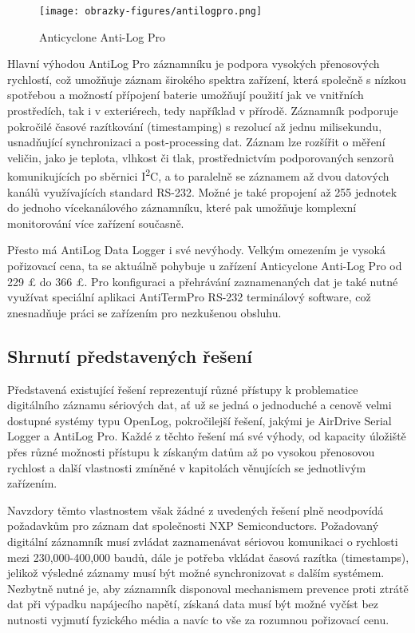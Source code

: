 \begin{figure}[h]
    \centering
    \texttt{[image: obrazky-figures/antilogpro.png]}
    
    \caption{Anticyclone Anti-Log Pro \cite{anticyclone_systems_antilog_pro_price}}
    \label{fig:antilog-pro}
\end{figure}

Hlavní výhodou AntiLog Pro záznamníku je podpora vysokých přenosových rychlostí, což umožňuje záznam širokého spektra zařízení, která společně s nízkou spotřebou a možností přípojení baterie umožňují použití jak ve vnitřních prostředích, tak i v exteriérech, tedy například v přírodě. Záznamník podporuje pokročilé časové razítkování (timestamping) s rezolucí až jednu milisekundu, usnadňující synchronizaci a post-processing dat. Záznam lze rozšířit o měření veličin, jako je teplota, vlhkost či tlak, prostřednictvím podporovaných senzorů komunikujících po sběrnici I\textsuperscript{2}C, a to paralelně se záznamem až dvou datových kanálů využívajících standard RS-232. Možné je také propojení až 255 jednotek do jednoho vícekanálového záznamníku, které pak umožňuje komplexní monitorování více zařízení současně. \cite{anticyclone_systems_antilog_pro, anticyclone_systems_antilog_pro_extended_logging}

Přesto má AntiLog Data Logger i své nevýhody. Velkým omezením je vysoká pořizovací cena, ta se aktuálně pohybuje u zařízení Anticyclone Anti-Log Pro od 229 £ do 366 £. Pro konfiguraci a přehrávání zaznamenaných dat je také nutné využívat speciální aplikaci AntiTermPro RS-232 terminálový software, což znesnadňuje práci se zařízením pro nezkušenou obsluhu.  \cite{anticyclone_systems_antilog_pro, anticyclone_systems_antilog_pro_price}

\subsection{Shrnutí představených řešení}

Představená existující řešení reprezentují různé přístupy k problematice digitálního záznamu sériových dat, ať už se jedná o jednoduché a cenově velmi dostupné systémy typu OpenLog, pokročilejší řešení, jakými je  AirDrive Serial Logger a AntiLog Pro. Každé z těchto řešení má své výhody, od kapacity úložiště přes různé možnosti přístupu k získaným datům až po vysokou přenosovou rychlost a další vlastnosti zmíněné v kapitolách věnujících se jednotlivým zařízením.

Navzdory těmto vlastnostem však žádné z uvedených řešení plně neodpovídá požadavkům pro záznam dat společnosti NXP Semiconductors. Požadovaný digitální záznamník musí zvládat zaznamenávat sériovou komunikaci o rychlosti mezi 230,000-400,000 baudů, dále je potřeba vkládat časová razítka (timestamps), jelikož výsledné záznamy musí být možné synchronizovat s dalším systémem. Nezbytně nutné je, aby záznamník disponoval mechanismem prevence proti ztrátě dat při výpadku napájecího napětí, získaná data musí být možné vyčíst bez nutnosti vyjmutí fyzického média a navíc to vše za rozumnou pořizovací cenu.


